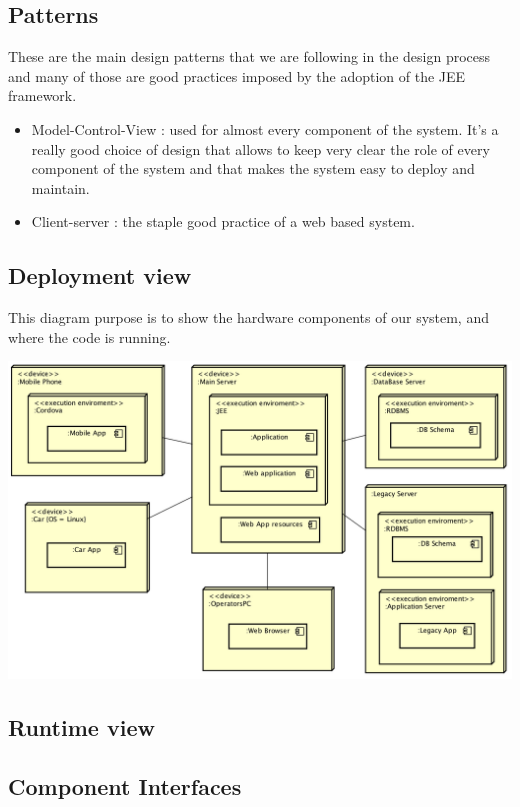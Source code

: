 \documentclass[]{article}
\providecommand{\tightlist}{%
  \setlength{\itemsep}{0pt}\setlength{\parskip}{0pt}}
\begin{document}
\subsection{Patterns}\label{patterns}

These are the main design patterns that we are following in the design
process and many of those are good practices imposed by the adoption of
the JEE framework.

\begin{itemize}
\tightlist
\item
  Model-Control-View : used for almost every component of the system.
  It's a really good choice of design that allows to keep very clear the
  role of every component of the system and that makes the system easy
  to deploy and maintain.
\item
  Client-server : the staple good practice of a web based system.
\end{itemize}

\subsection{Deployment view}\label{deployment-view}

This diagram purpose is to show the hardware components of our system,
and where the code is running.\newline
\centerline{\includegraphics{./deployment/diagram.png}}

\subsection{Runtime view}\label{runtime-view}

\subsection{Component Interfaces}\label{component-interfaces}
\end{document}
